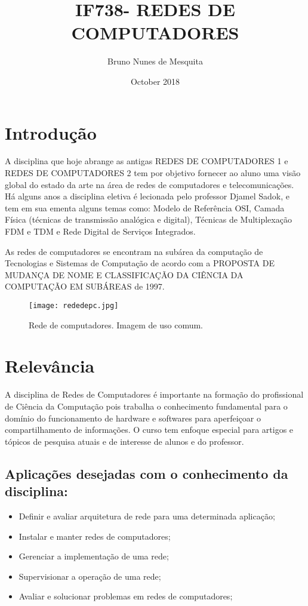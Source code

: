 \documentclass{article}
\title{IF738- REDES DE COMPUTADORES}
\author{Bruno Nunes de Mesquita }
\date{October 2018}
\begin{document}
\maketitle

\section{Introdução}
A disciplina que hoje abrange as antigas REDES DE COMPUTADORES 1 e REDES DE COMPUTADORES 2 tem por objetivo fornecer ao aluno uma visão global do estado da arte na área de redes de computadores e telecomunicações. Há alguns anos a disciplina eletiva é lecionada pelo professor Djamel Sadok, e tem em sua ementa alguns temas como: \cite{sitedadisciplina}Modelo de Referência OSI, Camada Física (técnicas de transmissão analógica e digital), Técnicas de Multiplexação FDM e TDM e Rede Digital de Serviços Integrados.

As redes de computadores se encontram na subárea da computação de Tecnologias e Sistemas de Computação de acordo com a \cite{sitedaufmg}PROPOSTA DE MUDANÇA DE NOME E CLASSIFICAÇÃO DA CIÊNCIA DA COMPUTAÇÃO EM SUBÁREAS de 1997.

\begin{figure}[!htb]
      \centering
      \texttt{[image: rededepc.jpg]}
      \caption{Rede de computadores. Imagem de uso comum.}
      \label{fig:rede de computadores}
\end{figure}

\section{Relevância}
\cite{sitedaunip}A disciplina de Redes de Computadores é importante na formação do profissional de Ciência da Computação pois trabalha o conhecimento fundamental para o domínio do funcionamento de hardware e softwares para aperfeiçoar o compartilhamento de informações. O curso tem enfoque especial para artigos e tópicos de pesquisa atuais e de interesse de alunos e do professor.
\subsection{Aplicações desejadas com o conhecimento da disciplina:}
\begin{itemize}
    \item Definir e avaliar arquitetura de rede para uma determinada aplicação;
    \item Instalar e manter redes de computadores;
    \item Gerenciar a implementação de uma rede;
    \item Supervisionar a operação de uma rede;
    \item Avaliar e solucionar problemas em redes de computadores;
\end{itemize}
\end{document}
